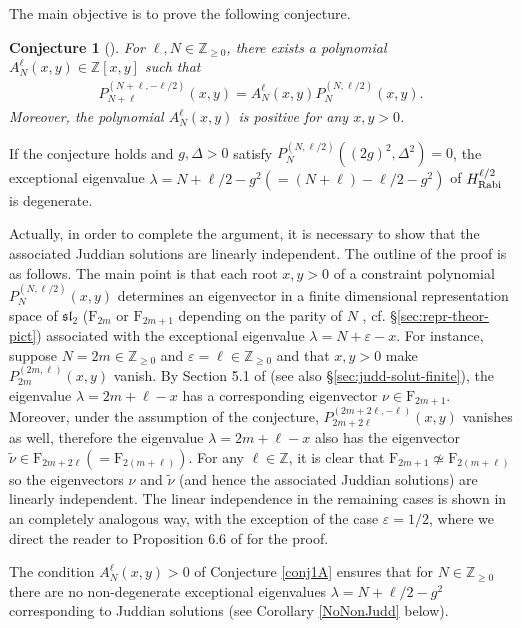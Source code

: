 \documentclass[11pt]{article}
\numberwithin{equation}{section}
\newcommand{\Z}{\mathbb{Z}} %
\newcommand{\e}{\varepsilon}
\newcommand{\HRabi}[1]{H_{\text{\upshape Rabi}}^{#1}} %
\newcommand{\cp}[2]{P^{(#1)}_{#2}} %
\newcommand{\RpnSymbol}[1]{\bm{\mathrm{#1}}}
\newcommand{\rF}{\RpnSymbol{F}}
\newcommand{\QEDhere}{\pushQED{\qed}\qedhere\popQED}
\theoremstyle{plain}
\newtheorem{conject}[thm]{Conjecture}
\theoremstyle{definition}
\theoremstyle{remark}
\begin{document}
The main objective is to prove the following conjecture.

\begin{conject}[\cite{W2016JPA}]\label{W2016JPA}
  \label{conj1A}
  For  \(\ell, N \in \Z_{\geq 0}\), there exists a polynomial \( A^\ell_N(x,y) \in \Z[x,y]\) such that
  \begin{align} \label{eq:conj}
   \cp{N+\ell,-\ell/2}{N+\ell}(x,y) =  A^\ell_N(x,y) \cp{N,\ell/2}{N}(x,y).
  \end{align}
  Moreover, the polynomial \( A^\ell_N(x,y)\) is positive for any $x, y > 0$. \QEDhere
\end{conject}

If the conjecture holds and \(g,\Delta >0 \) satisfy \(\cp{N,\ell/2}{N}((2g)^2,\Delta^2) = 0\), the exceptional eigenvalue
\( \lambda =  N  +  \ell/2 - g^2 ( = (N+\ell)  - \ell/2 - g^2) \) of \(\HRabi{\ell/2}\) is degenerate.

Actually, in order to complete the argument, it is necessary to show that the associated Juddian solutions are linearly independent.
The outline of the proof is as follows. The main point is that each root \(x,y>0\) of a constraint polynomial
\(\cp{N,\ell/2}{N}(x,y)\) determines an eigenvector in a finite dimensional representation space of  \(\mathfrak{sl}_2 \) (\(\rF_{2m} \) or \(\rF_{2m+1} \)  depending on the parity of \(N\) , cf. \S\ref{sec:repr-theor-pict}) associated with the exceptional eigenvalue \(\lambda = N  + \e - x \). For instance, suppose \(N = 2m \in \Z_{\geq 0}\) and \(\e = \ell \in \Z_{\geq 0}\) and that \(x,y>0\) make \(\cp{2 m,\ell}{2 m}(x,y)\) vanish. By Section 5.1 of \cite{W2016JPA} (see also \S\ref{sec:judd-solut-finite}), the eigenvalue \(\lambda = 2m + \ell - x \) has a corresponding eigenvector \(\nu \in \rF_{2m + 1} \). Moreover, under the
assumption of the conjecture, \(\cp{2m + 2\ell,-\ell}{2 m+2\ell}(x,y)\) vanishes as well, therefore the eigenvalue \(\lambda = 2m + \ell - x\)
also has the eigenvector \(\tilde{\nu} \in \rF_{2m + 2\ell} (= \rF_{2(m+\ell)}) \). For any \(\ell \in \Z\), it is clear that \( \rF_{2m + 1} \not\simeq \rF_{2(m+\ell)}\)
so the eigenvectors \(\nu \) and \(\tilde{\nu}\) (and hence the associated Juddian solutions) are linearly independent. The linear
independence in the remaining cases is shown in an completely analogous way, with the exception of the case \(\e = 1/2\), where we direct
the reader to Proposition 6.6 of \cite{W2016JPA} for the proof.

The condition \( A^\ell_N(x,y)>0\) of Conjecture \ref{conj1A} ensures that for \(N \in \Z_{\geq 0} \) there are no non-degenerate exceptional
eigenvalues \(\lambda = N  +  \ell/2 - g^2\) corresponding to Juddian solutions (see Corollary \ref{NoNonJudd} below).
\end{document}
